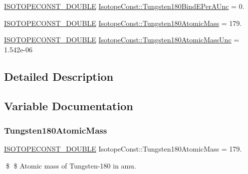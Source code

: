 \begin{DoxyCompactItemize}
\mbox{\hyperlink{group___isotope_const-_macros_ga8f45a7272ce02c0b4c65c44636ed719a}{I\+S\+O\+T\+O\+P\+E\+C\+O\+N\+S\+T\+\_\+\+D\+O\+U\+B\+LE}} \mbox{\hyperlink{group___isotope_const-_tungsten-_w180_gadc57e5957df51d464f4262dc1b905ba4}{Isotope\+Const\+::\+Tungsten180\+Bind\+E\+Per\+A\+Unc}} = 0.
\item 
\mbox{\hyperlink{group___isotope_const-_macros_ga8f45a7272ce02c0b4c65c44636ed719a}{I\+S\+O\+T\+O\+P\+E\+C\+O\+N\+S\+T\+\_\+\+D\+O\+U\+B\+LE}} \mbox{\hyperlink{group___isotope_const-_tungsten-_w180_ga253ba9a5a649fc9a3fb5f128eb270fe2}{Isotope\+Const\+::\+Tungsten180\+Atomic\+Mass}} = 179.
\item 
\mbox{\hyperlink{group___isotope_const-_macros_ga8f45a7272ce02c0b4c65c44636ed719a}{I\+S\+O\+T\+O\+P\+E\+C\+O\+N\+S\+T\+\_\+\+D\+O\+U\+B\+LE}} \mbox{\hyperlink{group___isotope_const-_tungsten-_w180_ga61ce7fe6a1070e401b3f0a6c58c41edc}{Isotope\+Const\+::\+Tungsten180\+Atomic\+Mass\+Unc}} = 1.\+542e-\/06
\end{DoxyCompactItemize}


\subsection{Detailed Description}


\subsection{Variable Documentation}
\mbox{\label{group___isotope_const-_tungsten-_w180_ga253ba9a5a649fc9a3fb5f128eb270fe2}} 
\subsubsection{\texorpdfstring{Tungsten180\+Atomic\+Mass}{Tungsten180AtomicMass}}
{\footnotesize\ttfamily \mbox{\hyperlink{group___isotope_const-_macros_ga8f45a7272ce02c0b4c65c44636ed719a}{I\+S\+O\+T\+O\+P\+E\+C\+O\+N\+S\+T\+\_\+\+D\+O\+U\+B\+LE}} Isotope\+Const\+::\+Tungsten180\+Atomic\+Mass = 179.}

\$ \$ Atomic mass of Tungsten-\/180 in amu. \mbox{\label{group___isotope_const-_tungsten-_w180_ga61ce7fe6a1070e401b3f0a6c58c41edc}} 
